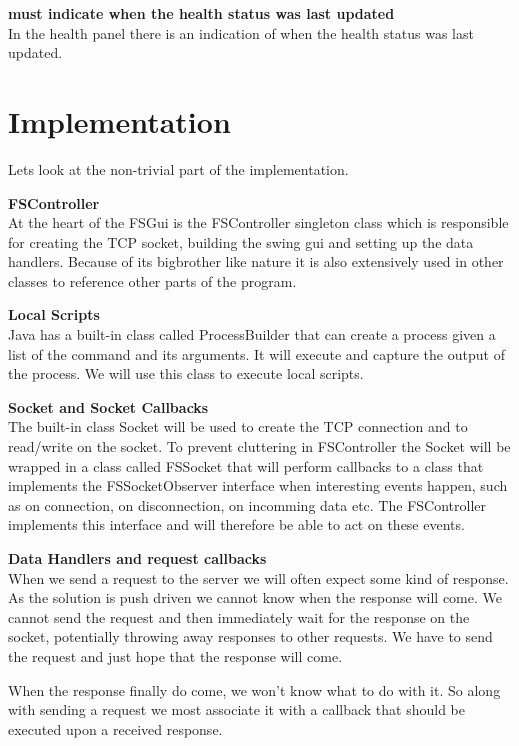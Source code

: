 \textbf{must indicate when the health status was last updated} \\
In the health panel there is an indication of when the health status was last updated.








\section{Implementation}
Lets look at the non-trivial part of the implementation.

\textbf{FSController} \\
At the heart of the FSGui is the FSController singleton class which is responsible for creating the TCP socket, building the swing gui and setting up the data handlers. Because of its bigbrother like nature it is also extensively used in other classes to reference other parts of the program.

\textbf{Local Scripts} \\
Java has a built-in class called ProcessBuilder that can create a process given a list of the command and its arguments. It will execute and capture the output of the process. We will use this class to execute local scripts.

\textbf{Socket and Socket Callbacks} \\
The built-in class Socket will be used to create the TCP connection and to read/write on the socket. To prevent cluttering in FSController the Socket will be wrapped in a class called FSSocket that will perform callbacks to a class that implements the FSSocketObserver interface when interesting events happen, such as on connection, on disconnection, on incomming data etc. The FSController implements this interface and will therefore be able to act on these events.

\textbf{Data Handlers and request callbacks} \\
When we send a request to the server we will often expect some kind of response. As the solution is push driven we cannot know when the response will come. We cannot send the request and then immediately wait for the response on the socket, potentially throwing away responses to other requests. We have to send the request and just hope that the response will come.

When the response finally do come, we won't know what to do with it. So along with sending a request we most associate it with a callback that should be executed upon a received response.

